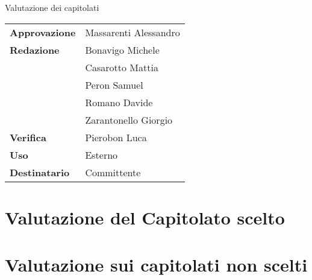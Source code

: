 \documentclass{article}
\begin{document}
\begin{center}

    
    \Huge Valutazione dei capitolati
        
    \vspace{2cm}
    
    \normalsize
    \begin{center}
        \begin{tabularx}{7cm}{l | X}            
            \textbf{Approvazione} & Massarenti Alessandro\\
            \textbf{Redazione} & Bonavigo Michele \\
            & Casarotto Mattia\\
            & Peron Samuel\\
            & Romano Davide\\
            & Zarantonello Giorgio\\
            \textbf{Verifica} & Pierobon Luca\\
            \hline
            \textbf{Uso} & Esterno\\
            \textbf{Destinatario} & Committente\\
        \end{tabularx}
    \end{center}
        
\end{center}

\tableofcontents

\newpage

\section{Valutazione del Capitolato scelto}

\pagebreak
\section{Valutazione sui capitolati non scelti}

\pagebreak

\pagebreak

\pagebreak

\pagebreak

\pagebreak

\end{document}
